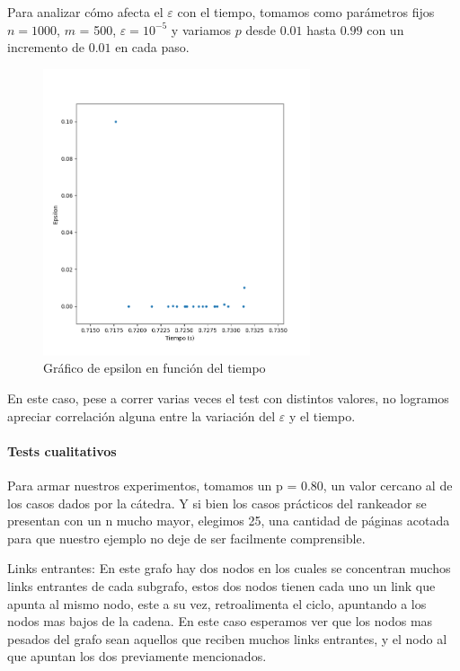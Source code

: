 Para analizar c\'omo afecta el $\varepsilon$ con el tiempo, tomamos como par\'ametros fijos $n = 1000$, $m$ = 500,
$\varepsilon = 10^{-5}$ y variamos $p$ desde $0.01$ hasta $0.99$ con un incremento de $0.01$ en cada paso.
\begin{figure}[H] 
\centering
\includegraphics[width=0.7\textwidth]{img/Eps.png}
\caption{Gr\'afico de epsilon en funci\'on del tiempo}
\label{fig:eps}
\end{figure}

En este caso, pese a correr varias veces el test con distintos valores, no logramos apreciar correlaci\'on alguna entre la variaci\'on del $\varepsilon$ y el
tiempo.

\paragraph{Tests cualitativos}

Para armar nuestros experimentos, tomamos un p = 0.80, un valor cercano al de los casos dados por la c\'atedra. Y si bien los casos pr\'acticos del rankeador se presentan con un n mucho mayor, elegimos 25, una cantidad de p\'aginas acotada para que nuestro ejemplo no deje de ser facilmente comprensible.

Links entrantes: En este grafo hay dos nodos en los cuales se concentran muchos links entrantes de cada subgrafo, estos dos nodos tienen cada uno un link que apunta al mismo nodo, este a su vez, retroalimenta el ciclo, apuntando a los nodos mas bajos de la cadena.
En este caso esperamos ver que los nodos mas pesados del grafo sean aquellos que reciben muchos links entrantes, y el nodo al que apuntan los dos previamente mencionados.

